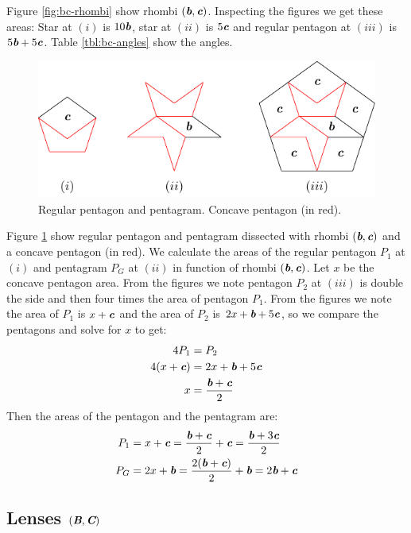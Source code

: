 \documentclass[11pt]{article}
\def\mathbi#1{\textbf{\em #1}}
\begin{document}
Figure \ref{fig:bc-rhombi} show rhombi $(\mathbi{b},\mathbi{c})$. 
Inspecting the figures we get these areas:
Star at $(i)$ is $10\mathbi{b}$, star at $(ii)$ is $5\mathbi{c}$ and 
regular pentagon at $(iii)$ is $5\mathbi{b} + 5\mathbi{c}$. Table \ref {tbl:bc-angles} show the angles.

\begin{figure}[H]
\centering
\includegraphics[scale=1.1]{bc/penta}
\caption{Regular pentagon and pentagram. Concave pentagon (in red).}
\label{fig:bc-penta}
\end{figure}

Figure \ref{fig:bc-penta} show regular pentagon and pentagram dissected with rhombi $(\mathbi{b},\mathbi{c})$ and a concave pentagon (in red). We calculate the areas of the regular pentagon $P_1$ at $(i)$ and pentagram $P_G$ at $(ii)$ in function of rhombi $(\mathbi{b},\mathbi{c})$. Let $x$ be the concave pentagon area. From the figures we note pentagon $P_2$ at $(iii)$ is double the side and then four times the area of pentagon $P_1$. From the figures we note the area of $P_1$ is $x + \mathbi{c}$ and the area of $P_2$ is $2x + \mathbi{b} + 5\mathbi{c}$, so we compare the pentagons and solve for $x$ to get:
\begin{align}
4P_1 &= P_2 \nonumber\\
4(x + \mathbi{c}) &= 2x + \mathbi{b} + 5\mathbi{c} \nonumber\\
x &= \frac{\mathbi{b} + \mathbi{c}}2
\end{align}
Then the areas of the pentagon and the pentagram are:
\begin{align}
P_1 &= x + \mathbi{c} 
 = \frac{\mathbi{b} + \mathbi{c}}2 + \mathbi{c}
 = \frac{\mathbi{b} + 3\mathbi{c}}2 \\
P_G &= 2x + \mathbi{b}
 = \frac{2(\mathbi{b} + \mathbi{c})}2 + \mathbi{b}
 = 2\mathbi{b} + \mathbi{c}
\end{align}

\subsection{Lenses $(\mathbi{B},\mathbi{C})$}
\end{document}
